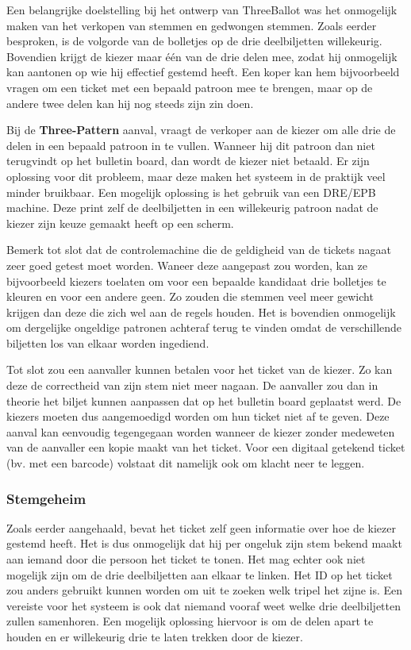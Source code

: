 \npar Een belangrijke doelstelling bij het ontwerp van ThreeBallot was het onmogelijk maken van het verkopen van stemmen en gedwongen stemmen. Zoals eerder besproken, is de volgorde van de bolletjes op de drie deelbiljetten willekeurig. Bovendien krijgt de kiezer maar \'e\'en van de drie delen mee, zodat hij onmogelijk kan aantonen op wie hij effectief gestemd heeft. Een koper kan hem bijvoorbeeld vragen om een ticket met een bepaald patroon mee te brengen, maar op de andere twee delen kan hij nog steeds zijn zin doen.

\npar Bij de \textbf{Three-Pattern} aanval, vraagt de verkoper aan de kiezer om alle drie de delen in een bepaald patroon in te vullen. Wanneer hij dit patroon dan niet terugvindt op het bulletin board, dan wordt de kiezer niet betaald. Er zijn oplossing voor dit probleem, maar deze maken het systeem in de praktijk veel minder bruikbaar. Een mogelijk oplossing is het gebruik van een DRE/EPB machine. Deze print zelf de deelbiljetten in een willekeurig patroon nadat de kiezer zijn keuze gemaakt heeft op een scherm.

\npar Bemerk tot slot dat de controlemachine die de geldigheid van de tickets nagaat zeer goed getest moet worden. Waneer deze aangepast zou worden, kan ze bijvoorbeeld kiezers toelaten om voor een bepaalde kandidaat drie bolletjes te kleuren en voor een andere geen. Zo zouden die stemmen veel meer gewicht krijgen dan deze die zich wel aan de regels houden. Het is bovendien onmogelijk om dergelijke ongeldige patronen achteraf terug te vinden omdat de verschillende biljetten los van elkaar worden ingediend.

\npar Tot slot zou een aanvaller kunnen betalen voor het ticket van de kiezer. Zo kan deze de correctheid van zijn stem niet meer nagaan. De aanvaller zou dan in theorie het biljet kunnen aanpassen dat op het bulletin board geplaatst werd. De kiezers moeten dus aangemoedigd worden om hun ticket niet af te geven. Deze aanval kan eenvoudig tegengegaan worden wanneer de kiezer zonder medeweten van de aanvaller een kopie maakt van het ticket. Voor een digitaal getekend ticket (bv. met een barcode) volstaat dit namelijk ook om klacht neer te leggen.

\subsubsection{Stemgeheim}

Zoals eerder aangehaald, bevat het ticket zelf geen informatie over hoe de kiezer gestemd heeft. Het is dus onmogelijk dat hij per ongeluk zijn stem bekend maakt aan iemand door die persoon het ticket te tonen. Het mag echter ook niet mogelijk zijn om de drie deelbiljetten aan elkaar te linken. Het ID op het ticket zou anders gebruikt kunnen worden om uit te zoeken welk tripel het zijne is. Een vereiste voor het systeem is ook dat niemand vooraf weet welke drie deelbiljetten zullen samenhoren. Een mogelijk oplossing hiervoor is om de delen apart te houden en er willekeurig drie te laten trekken door de kiezer.

